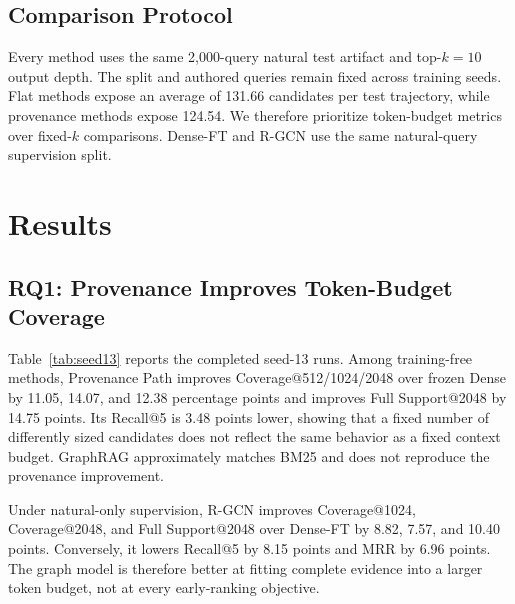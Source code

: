 \documentclass[sigconf,anonymous,review]{acmart}
\begin{document}
\subsection{Comparison Protocol}

Every method uses the same 2,000-query natural test artifact and top-$k=10$ output depth. The split and authored queries remain fixed across training seeds. Flat methods expose an average of 131.66 candidates per test trajectory, while provenance methods expose 124.54. We therefore prioritize token-budget metrics over fixed-$k$ comparisons. Dense-FT and R-GCN use the same natural-query supervision split.

\section{Results}
\label{sec:results}

\subsection{RQ1: Provenance Improves Token-Budget Coverage}

Table~\ref{tab:seed13} reports the completed seed-13 runs. Among training-free methods, Provenance Path improves Coverage@512/1024/2048 over frozen Dense by 11.05, 14.07, and 12.38 percentage points and improves Full Support@2048 by 14.75 points. Its Recall@5 is 3.48 points lower, showing that a fixed number of differently sized candidates does not reflect the same behavior as a fixed context budget. GraphRAG approximately matches BM25 and does not reproduce the provenance improvement.

Under natural-only supervision, R-GCN improves Coverage@1024, Coverage@2048, and Full Support@2048 over Dense-FT by 8.82, 7.57, and 10.40 points. Conversely, it lowers Recall@5 by 8.15 points and MRR by 6.96 points. The graph model is therefore better at fitting complete evidence into a larger token budget, not at every early-ranking objective.
\end{document}
